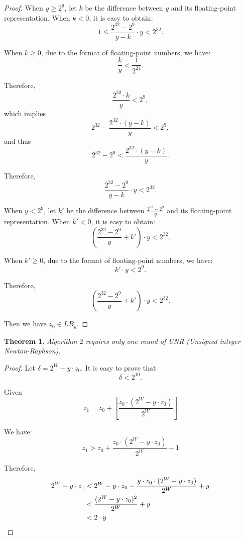\documentclass[12pt]{elsarticle}
\newtheorem{theorem}{Theorem}
\begin{document}
\begin{proof}
    
    When $y\ge 2^9$,
    let $k$ be the difference between $y$ and its floating-point representation. When $k < 0$, it is easy to obtain:
    $$1 \leq \frac{2^{32} - 2^9}{y - k} \cdot y < 2^{32}.$$
    
    When $k \geq 0$, due to the format of floating-point numbers, we have:
    $$\frac{k}{y}<\frac{1}{2^{24}}.$$
    
    Therefore,
    $$\frac{2^{32} \cdot k}{y} < 2^9,$$
    which implies
    $$2^{32} - \frac{2^{32} \cdot (y-k)}{y} < 2^9,$$
    and thus
    $$2^{32} - 2^9 < \frac{2^{32} \cdot (y - k)}{y}.$$
    
    Therefore,
    $$\frac{2^{32} - 2^9}{y - k} \cdot y < 2^{32}.$$

    When $y < 2^9$, let $k'$ be the difference between $\frac{2^{32} - 2^9}{y}$ and its floating-point representation. When $k' < 0$, it is easy to obtain:
    $$(\frac{2^{32} - 2^9}{y}+k')\cdot y < 2^{32}.$$

    When $k' \geq 0$, due to the format of floating-point numbers, we have:
    $$k'\cdot y<2^9.$$

      Therefore,
    $$(\frac{2^{32} - 2^9}{y}+k')\cdot y < 2^{32}.$$


Then we have $z_0 \in LB_y$.
    
    
\end{proof}  
   
\begin{theorem}\label{thm5}
    Algorithm $2$ requires only one round of UNR (Unsigned integer Newton-Raphson).
    \end{theorem}
\begin{proof}



    Let 
    $\delta = 2^W - y \cdot z_0 $. It is easy to prove that 
    $$\delta < 2^{10}.$$

Given
$$z_1 = z_0 + \left\lfloor \frac{z_0 \cdot (2^W - y \cdot z_0)}{2^W} \right\rfloor$$

We have:
$$z_1 > z_0 + \frac{z_0 \cdot (2^W - y \cdot z_0)}{2^W} - 1$$

Therefore,
\begin{align}
    2^W - y \cdot z_1 &< 2^W - y \cdot z_0 - \frac{y \cdot z_0 \cdot (2^W - y \cdot z_0)}{2^W} + y \notag \\
    &< \frac{(2^W - y \cdot z_0)^2}{2^W} + y \notag \\
    &< 2 \cdot y \notag
\end{align}


    \end{proof}  
    
\end{document}
